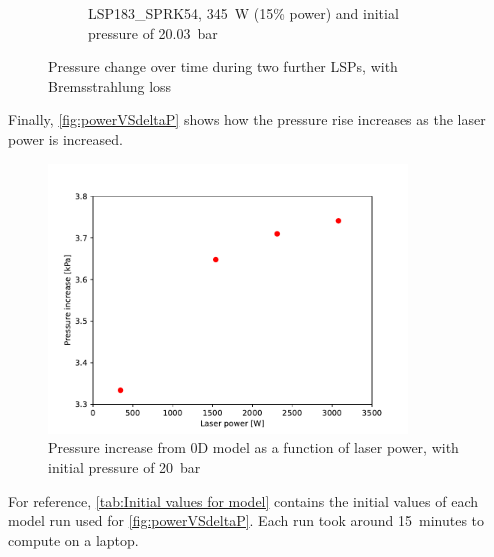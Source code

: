 \begin{figure}[!ht]
\begin{subfigure}[t]{0.45\textwidth}
                \caption{LSP183\_SPRK54, \qty{345}{W} (15\% power) and initial pressure of \qty{20.03}{bar}}
            \end{subfigure}
            \caption{Pressure change over time during two further LSPs, with Bremsstrahlung loss}
            \label{fig:Two further LSPs}
        \end{figure}

        Finally, \autoref{fig:powerVSdeltaP} shows how the pressure rise increases as the laser power is increased.

        \begin{figure}[!ht]
            \centering
            \includegraphics[width=0.85\textwidth]{assets/2 models/powerVSdeltaP.pdf}
            \caption{Pressure increase from 0D model as a function of laser power, with initial pressure of \qty{20}{bar}}
            \label{fig:powerVSdeltaP}
        \end{figure}

        For reference, \autoref{tab:Initial values for model} contains the initial values of each model run used for \autoref{fig:powerVSdeltaP}. Each run took around \qty{15}{minutes} to compute on a laptop.

